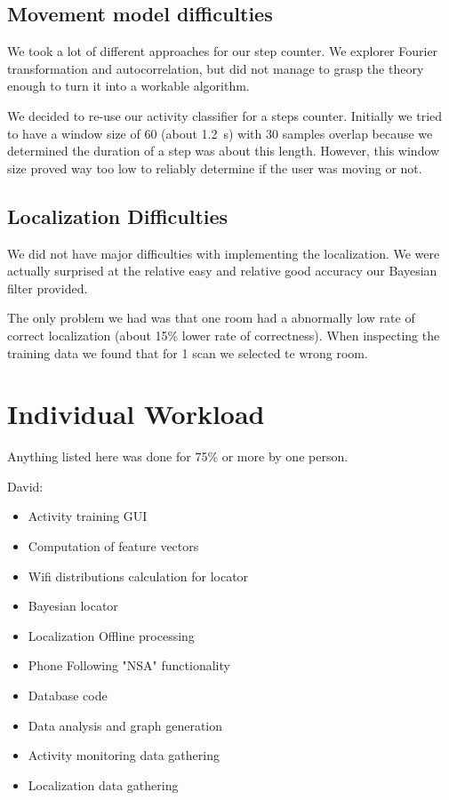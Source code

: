 \documentclass[a4paper,10pt,twoside]{IEEEtran}
\begin{document}
\subsection{Movement model difficulties}

We took a lot of different approaches for our step counter.
We explorer Fourier transformation and autocorrelation, but did not manage to grasp the theory enough to turn it into a workable algorithm.

We decided to re-use our activity classifier for a steps counter.
Initially we tried to have a window size of 60 (about 1.2~s) with 30 samples overlap because we determined the duration of a step was about this length.
However, this window size proved way too low to reliably determine if the user was moving or not.

\subsection{Localization Difficulties}

We did not have major difficulties with implementing the localization.
We were actually surprised at the relative easy and relative good accuracy our Bayesian filter provided.

The only problem we had was that one room had a abnormally low rate of correct localization (about 15\% lower rate of correctness).
When inspecting the training data we found that for 1 scan we selected te wrong room.

\section{Individual Workload}
\label{sec:individual-workload}
Anything listed here was done for 75\% or more by one person.

David:
\begin{itemize}
	\item Activity training GUI
    \item Computation of feature vectors
    \item Wifi distributions calculation for locator
    \item Bayesian locator
    \item Localization Offline processing
    \item Phone Following "NSA" functionality
    \item Database code
    \item Data analysis and graph generation
    \item Activity monitoring data gathering
    \item Localization data gathering
\end{itemize}
\end{document}
